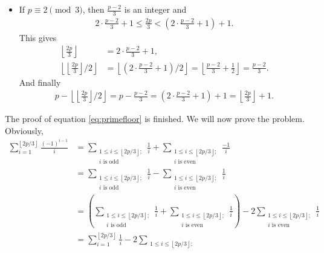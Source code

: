 \documentclass{subfile}
\begin{document}
\begin{solution}
\begin{itemize}
			\item If $p \equiv 2 \pmod 3$, then $\frac{p-2}{3}$ is an integer and
			\begin{align*}
			2\cdot\frac {p - 2}{3} + 1\leq\frac {2p}{3} < \left(2\cdot\frac {p - 2}{3} + 1\right) + 1.
			\end{align*}
			This gives
			\begin{align*}
			\left\lfloor\frac {2p}{3}\right\rfloor &= 2\cdot\frac {p - 2}{3} + 1,\\
			\left\lfloor\left\lfloor\frac {2p}{3}\right\rfloor /2\right\rfloor &= 	\left\lfloor\left(2\cdot\frac {p - 2}{3} + 1\right)/2\right\rfloor = 	\left\lfloor\frac {p - 2}{3} + \frac {1}{2}\right\rfloor = \frac{p-2}{3}.
			\end{align*}
			And finally
			\begin{align*}
			p - \left\lfloor\left\lfloor\frac {2p}{3}\right\rfloor /2\right\rfloor = p - \frac {p - 2}{3} = \left(2\cdot\frac {p - 2}{3} + 1\right) + 1 = \left\lfloor\frac {2p}{3}\right\rfloor + 1.
			\end{align*}
		\end{itemize}
		The proof of equation \eqref{eq:primefloor} is finished. We will now prove the problem. Obviously,
		\begin{align*}
		\sum_{i = 1}^{\left\lfloor 2p/3\right\rfloor}\frac {\left( - 1\right)^{i - 1}}{i} &= \sum_{\substack{1\leq i\leq \left\lfloor 2p/3\right\rfloor ; \\
				i\text{ is odd}}}\frac {1}{i} + \sum_{\substack{1\leq i\leq \left\lfloor 2p/3\right\rfloor ; \\
				i\text{ is even}}}\frac { - 1}{i} \\
		&= \sum_{\substack{1\leq i\leq \left\lfloor 2p/3\right\rfloor ; \\
				i\text{ is odd}}}\frac {1}{i} - \sum_{\substack{1\leq i\leq \left\lfloor 2p/3\right\rfloor ; \\
				i\text{ is even}}}\frac {1}{i}\\
		&= \left(\sum_{\substack{1\leq i\leq \left\lfloor 2p/3\right\rfloor ; \\
				i\text{ is odd}}}\frac {1}{i} + \sum_{\substack{1\leq i\leq \left\lfloor 2p/3\right\rfloor ; \\
				i\text{ is even}}}\frac {1}{i}\right) - 2\sum_{\substack{1\leq i\leq \left\lfloor 2p/3\right\rfloor ; \\
				i\text{ is even}}}\frac {1}{i} \\
		&= \sum_{i = 1}^{\left\lfloor 2p/3\right\rfloor}\frac {1}{i} - 2\sum_{\substack{1\leq i\leq \left\lfloor 2p/3\right\rfloor ; \\
}}
\end{align*}
\end{solution}
\end{document}
